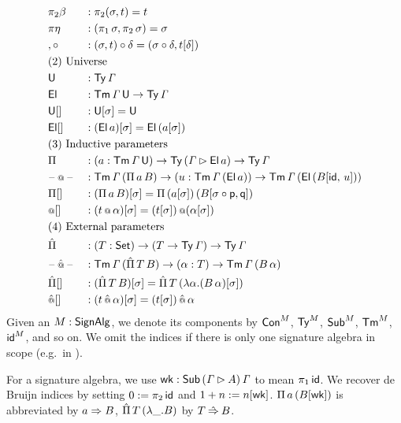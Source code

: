 \documentclass[a4paper,UKenglish,cleveref, autoref]{lipics-v2019}
\begin{document}
\begin{definition}
\begin{alignat*}{5}
  & {\pi_2\beta} && : \pi_2(\sigma, t) = t \\
  & {\pi\eta} && : (\pi_1\,\sigma, \pi_2\,\sigma) = \sigma \\
  & {,\circ} && : (\sigma, t)\circ\delta = (\sigma\circ\delta, t[\delta]) \\
  & \rlap{(2) Universe} \\
  & \U && : \Ty\,\GG \\
  & \El && : \Tm\,\GG\,\U\ra\Ty\,\GG \\
  & {\U[]} && : \U[\sigma] = \U \\
  & {\El[]} && : (\El\,a)[\sigma] = \El\,(a[\sigma]) \\
  & \rlap{(3) Inductive parameters} \\
  & \Pi && : (a:\Tm\,\GG\,\U)\ra\Ty\,(\GG\ext\El\,a)\ra\Ty\,\GG \\
  & \blank\oldapp\blank && : \Tm\,\GG\,(\Pi\,a\,B)\ra (u : \Tm\,\GG\,(\El\,a))
  \ra \Tm\,\GG\,(\El\,(B[\id,\,u])) \\
  & {\Pi[]} && : (\Pi\,a\,B)[\sigma] = \Pi\,(a[\sigma])\,(B[\sigma\circ\p,\q]) \\
  & {\oldapp[]} && : (t\oldapp\alpha)[\sigma] = (t[\sigma])\mathop{\oldapp}(\alpha[\sigma]) \\
  & \rlap{(4) External parameters} \\
  & \Pim && : (T:\Set)\ra(T\ra\Ty\,\GG)\ra\Ty\,\GG \\
  & \blank\appm \blank && : \Tm\,\GG\,(\Pim\,T\,B)\ra(\alpha:T) \ra\Tm\,\GG\,(B\,\alpha) \\
  & {\Pim[]} && : (\Pim\,T\,B)[\sigma] = \Pim\,T\,(\lambda \alpha.(B\,\alpha)[\sigma]) \\
  & {\appm[]} && : (t\appm\alpha)[\sigma] = (t[\sigma])\mathop{\appm}\alpha
\end{alignat*}
Given an $M:\mathsf{SignAlg}$, we denote its components by $\mathsf{Con}^M$, $\mathsf{Ty}^M$,
$\mathsf{Sub}^M$, $\mathsf{Tm}^M$, $\mathsf{id}^M$, and so on. We omit the indices if there is
only one signature algebra in scope (e.g.\ in
).
\end{definition}

\begin{definition}[Abbreviations]\label{def:abbrevs}
  For a signature algebra, we use $\mathsf{wk} : \mathsf{Sub}\,(\mathit{\Gamma}\rhd A)\,\mathit{\Gamma}$
  to mean $\pi_1\,\mathsf{id}$. We recover de Bruijn indices by setting
  $0:= \pi_2 \,\mathsf{id}$ and $1+n := n[\mathsf{wk}]$. $\Pi\,a\,(B[\mathsf{wk}])$ is
  abbreviated by $a\Rightarrow B$, $\hat{\Pi}\,T\,(\lambda\_.B)$ by $T\mathbin{\hat{\Rightarrow}} B$.
\end{definition}
\end{document}
